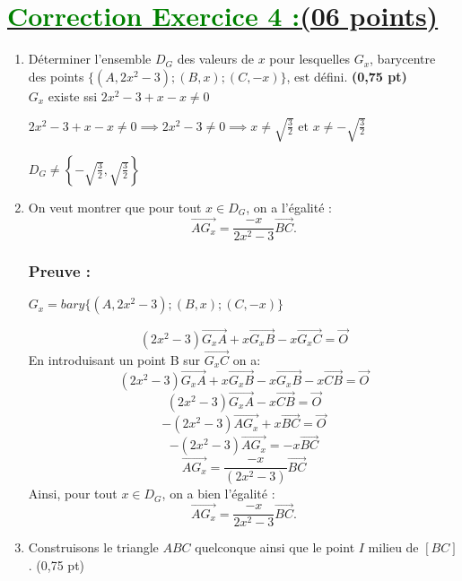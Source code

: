 \documentclass[12pt,a4paper]{article}
\begin{document}
\section*{\underline{\textcolor{green}{Correction Exercice 4 :}(06 points)}}
\begin{enumerate}
    \item Déterminer l’ensemble $D_G$ des valeurs de $x$ pour lesquelles $G_x$, barycentre\\ des points $\{(A, 2x^2 - 3); (B, x); (C, -x)\}$, est défini. \hfill \textbf{(0,75 pt)}\\
    $G_x$ existe ssi $2x^2 - 3+x-x \neq 0$
    
    $2x^2 - 3+x-x \neq 0 \implies 2x^2 - 3\neq 0  \implies  x\neq \sqrt{\frac{3}{2}} \text{ et } x\neq- \sqrt{\frac{3}{2}}$
    
    $D_G\neq\left\lbrace -\sqrt{\frac{3}{2}},\sqrt{\frac{3}{2}} \right\rbrace $

\item On veut montrer que pour tout \( x \in D_G \), on a l'égalité :
\[
\overrightarrow{AG_x} = \frac{-x}{2x^2 - 3} \overrightarrow{BC}.
\]

\subsubsection*{Preuve :}
$G_x=bary\{(A, 2x^2 - 3); (B, x); (C, -x)\}$

\[
(2x^2 - 3)\overrightarrow{G_xA}+x\overrightarrow{G_xB}-x\overrightarrow{G_xC}=\overrightarrow{O}
\]
En introduisant un point B sur $\overrightarrow{G_xC}$ on a:
\[
(2x^2 - 3)\overrightarrow{G_xA}+x\overrightarrow{G_xB}-x\overrightarrow{G_xB}-x\overrightarrow{CB}=\overrightarrow{O}
\]
\[
(2x^2 - 3)\overrightarrow{G_xA}-x\overrightarrow{CB}=\overrightarrow{O}
\]
\[
-(2x^2 - 3)\overrightarrow{AG_x}+x\overrightarrow{BC}=\overrightarrow{O}
\]
\[
-(2x^2 - 3)\overrightarrow{AG_x}=-x\overrightarrow{BC}
\]
\[
\overrightarrow{AG_x}=\frac{-x}{(2x^2 - 3)}\overrightarrow{BC}
\]
Ainsi, pour tout \( x \in D_G \), on a bien l'égalité :
\[
\overrightarrow{AG_x} = \frac{-x}{2x^2 - 3} \overrightarrow{BC}.
\]
\item Construisons le triangle $ABC$ quelconque ainsi que le point $I$ milieu de $[BC]$. \hfill (0,75 pt) 
\begin{center}
\end{center}
\end{enumerate}
\end{document}
